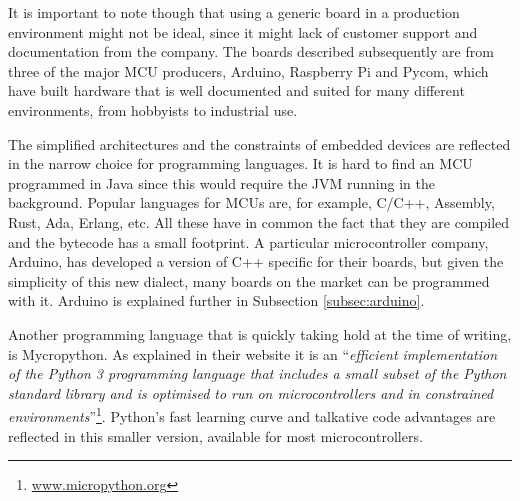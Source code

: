 		It is important to note though that using a generic board in a production environment might not be ideal, since it might lack of customer support and documentation from the company.
		The boards described subsequently are from three of the major MCU producers, Arduino, Raspberry Pi and Pycom, which have built hardware that is well documented and suited for many different environments, from hobbyists to industrial use.
		
		The simplified architectures and the constraints of embedded devices are reflected in the narrow choice for programming languages.
		It is hard to find an MCU programmed in Java since this would require the JVM running in the background.
		Popular languages for MCUs are, for example, C/C++, Assembly, Rust, Ada, Erlang, etc.
		All these have in common the fact that they are compiled and the bytecode has a small footprint.
		A particular microcontroller company, Arduino, has developed a version of C++ specific for their boards, but given the simplicity of this new dialect, many boards on the market can be programmed with it.
		Arduino is explained further in Subsection \ref{subsec:arduino}.
	
		Another programming language that is quickly taking hold at the time of writing, is Mycropython.
		As explained in their website it is an ``\textit{efficient implementation of the Python 3 programming language that includes a small subset of the Python standard library and is optimised to run on microcontrollers and in constrained environments}''\footnote{ \url{www.micropython.org}}.
		Python's fast learning curve and talkative code advantages are reflected in this smaller version, available for most microcontrollers.
		
	
